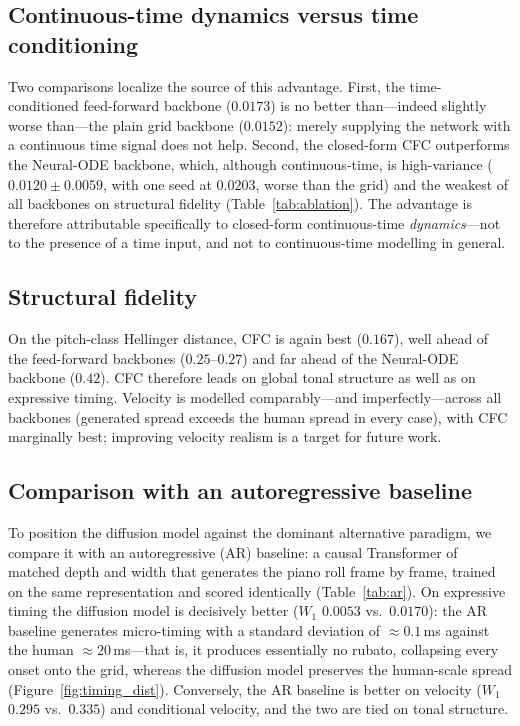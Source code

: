 \documentclass[review]{elsarticle}
\begin{document}
\subsection{Continuous-time dynamics versus time conditioning}
Two comparisons localize the source of this advantage. First, the time-conditioned
feed-forward backbone ($0.0173$) is no better than---indeed slightly worse than---the plain
grid backbone ($0.0152$): merely supplying the network with a continuous time signal does
not help. Second, the closed-form CFC outperforms the Neural-ODE backbone, which, although
continuous-time, is high-variance ($0.0120\pm0.0059$, with one seed at $0.0203$, worse than
the grid) and the weakest of all backbones on structural fidelity
(Table~\ref{tab:ablation}). The advantage is therefore attributable specifically to
closed-form continuous-time \emph{dynamics}---not to the presence of a time input, and not
to continuous-time modelling in general.

\subsection{Structural fidelity}
On the pitch-class Hellinger distance, CFC is again best ($0.167$), well ahead of the
feed-forward backbones ($0.25$--$0.27$) and far ahead of the Neural-ODE backbone ($0.42$).
CFC therefore leads on global tonal structure as well as on expressive timing. Velocity is
modelled comparably---and imperfectly---across all backbones (generated spread exceeds the
human spread in every case), with CFC marginally best; improving velocity realism is a
target for future work.

\subsection{Comparison with an autoregressive baseline}
\label{sec:ar}
To position the diffusion model against the dominant alternative paradigm, we compare it
with an autoregressive (AR) baseline: a causal Transformer of matched depth and width that
generates the piano roll frame by frame, trained on the same representation and scored
identically (Table~\ref{tab:ar}). On expressive timing the diffusion model is decisively
better ($W_1$ $0.0053$ vs.\ $0.0170$): the AR baseline generates micro-timing with a
standard deviation of $\approx\!0.1$\,ms against the human $\approx\!20$\,ms---that is, it
produces essentially no rubato, collapsing every onset onto the grid, whereas the diffusion
model preserves the human-scale spread (Figure~\ref{fig:timing_dist}). Conversely, the AR baseline is better on velocity
($W_1$ $0.295$ vs.\ $0.335$) and conditional velocity, and the two are tied on tonal
structure.
\end{document}
